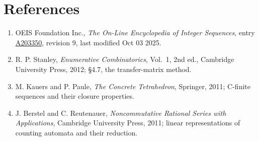 \documentclass[11pt]{article}
\theoremstyle{definition}
\begin{document}
\section{References}

\begin{enumerate}

\item OEIS Foundation Inc., \emph{The On-Line Encyclopedia of Integer Sequences}, entry \href{https://oeis.org/A203350}{A203350}, revision 9, last modified Oct 03 2025.

\item R. P. Stanley, \emph{Enumerative Combinatorics}, Vol.~1, 2nd ed., Cambridge University Press, 2012; \S4.7, the transfer-matrix method.

\item M. Kauers and P. Paule, \emph{The Concrete Tetrahedron}, Springer, 2011; C-finite sequences and their closure properties.

\item J. Berstel and C. Reutenauer, \emph{Noncommutative Rational Series with Applications}, Cambridge University Press, 2011; linear representations of counting automata and their reduction.

\end{enumerate}
\end{document}
